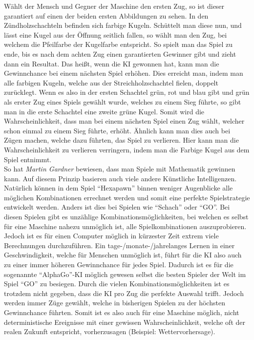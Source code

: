 Wählt der Mensch und Gegner der Maschine den ersten Zug, so ist dieser garantiert auf einen der beiden ersten Abbildungen zu sehen. In den Zündholzschachteln befinden sich farbige Kugeln. Schüttelt man diese nun, und lässt eine Kugel aus der Öffnung seitlich fallen, so wählt man den Zug, bei welchem die Pfeilfarbe der Kugelfarbe entspricht. So spielt man das Spiel zu ende, bis es nach dem achten Zug einen garantierten Gewinner gibt und zieht dann ein Resultat. Das heißt, wenn die KI gewonnen hat, kann man die Gewinnchance bei einem nächsten Spiel erhöhen. Dies erreicht man, indem man alle farbigen Kugeln, welche aus der Streichholzschachtel fielen, doppelt zurücklegt. Wenn es also in der ersten Schachtel grün, rot und blau gibt und grün als erster Zug eines Spiels gewählt wurde, welches zu einem Sieg führte, so gibt man in die erste Schachtel eine zweite grüne Kugel. Somit wird die Wahrscheinlichkeit, dass man bei einem nächsten Spiel einen Zug wählt, welcher schon einmal zu einem Sieg führte, erhöht. Ähnlich kann man dies auch bei Zügen machen, welche dazu führten, das Spiel zu verlieren. Hier kann man die Wahrscheinlichkeit zu verlieren verringern, indem man die Farbige Kugel aus dem Spiel entnimmt.
\\
So hat \textit{Martin Gardner} bewiesen, dass man Spiele mit Mathematik gewinnen kann. Auf diesem Prinzip basieren auch viele andere Künstliche Intelligenzen. Natürlich können in dem Spiel ``Hexapawn'' binnen weniger Augenblicke alle möglichen Kombinationen errechnet werden und somit eine perfekte Spielstrategie entwickelt werden. Anders ist dies bei Spielen wie ``Schach'' oder ``GO''. Bei diesen Spielen gibt es unzählige Kombinationsmöglichkeiten, bei welchen es selbst für eine Maschine nahezu unmöglich ist, alle Spielkombinationen auszuprobieren. Jedoch ist es für einen Computer möglich in kürzester Zeit extrem viele Berechnungen durchzuführen. Ein tage-/monate-/jahrelanges Lernen in einer Geschwindigkeit, welche für Menschen unmöglich ist, führt für die KI also auch zu einer immer höheren Gewinnchance für jedes Spiel. Dadurch ist es für die sogenannte ``AlphaGo''-KI möglich gewesen selbst die besten Spieler der Welt im Spiel ``GO'' zu besiegen. Durch die vielen Kombinationsmöglichkeiten ist es trotzdem nicht gegeben, dass die KI pro Zug die perfekte Auswahl trifft. Jedoch werden immer Züge gewählt, welche in bisherigen Spielen zu der höchsten Gewinnchance führten. Somit ist es also auch für eine Maschine möglich, nicht deterministische Ereignisse mit einer gewissen Wahrscheinlichkeit, welche oft der realen Zukunft entspricht, vorherzusagen (Beispiel: Wettervorhersage).

